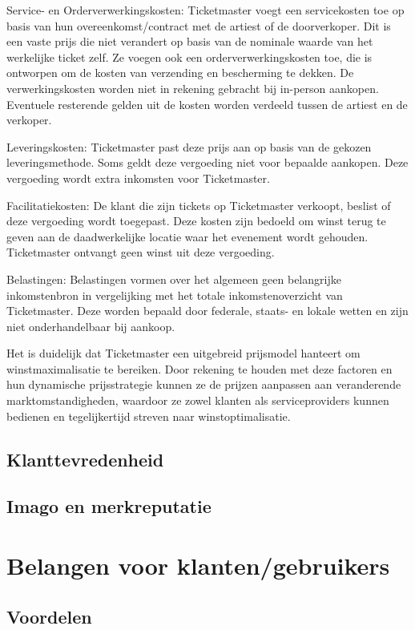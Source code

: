 \documentclass[a4paper, 12pt]{article}
\begin{document}
Service- en Orderverwerkingskosten: Ticketmaster voegt een servicekosten toe op basis van hun overeenkomst/contract met de artiest of de doorverkoper. Dit is een vaste prijs die niet verandert op basis van de nominale waarde van het werkelijke ticket zelf. Ze voegen ook een orderverwerkingskosten toe, die is ontworpen om de kosten van verzending en bescherming te dekken. De verwerkingskosten worden niet in rekening gebracht bij in-person aankopen. Eventuele resterende gelden uit de kosten worden verdeeld tussen de artiest en de verkoper.

Leveringskosten: Ticketmaster past deze prijs aan op basis van de gekozen leveringsmethode. Soms geldt deze vergoeding niet voor bepaalde aankopen. Deze vergoeding wordt extra inkomsten voor Ticketmaster.

Facilitatiekosten: De klant die zijn tickets op Ticketmaster verkoopt, beslist of deze vergoeding wordt toegepast. Deze kosten zijn bedoeld om winst terug te geven aan de daadwerkelijke locatie waar het evenement wordt gehouden. Ticketmaster ontvangt geen winst uit deze vergoeding.

Belastingen: Belastingen vormen over het algemeen geen belangrijke inkomstenbron in vergelijking met het totale inkomstenoverzicht van Ticketmaster. Deze worden bepaald door federale, staats- en lokale wetten en zijn niet onderhandelbaar bij aankoop.

\vspace{10 mm}

Het is duidelijk dat Ticketmaster een uitgebreid prijsmodel hanteert om winstmaximalisatie te bereiken. Door rekening te houden met deze factoren en hun dynamische prijsstrategie kunnen ze de prijzen aanpassen aan veranderende marktomstandigheden, waardoor ze zowel klanten als serviceproviders kunnen bedienen en tegelijkertijd streven naar winstoptimalisatie.

\subsection{Klanttevredenheid}
\subsection{Imago en merkreputatie}

\section{Belangen voor klanten/gebruikers}
\subsection{Voordelen}
\end{document}
